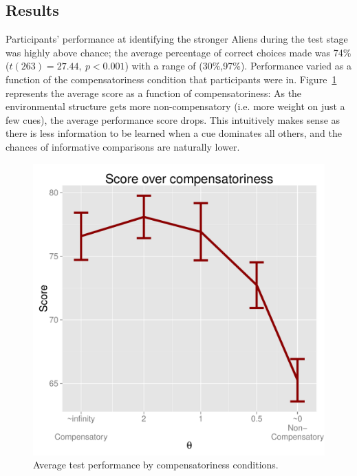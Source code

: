 \documentclass[10pt,letterpaper]{article}
\begin{document}
\subsection{Results}
Participants' performance at identifying the stronger Aliens during the test stage was highly above chance; the average percentage of correct choices made was 74\% ($t(263) = 27.44,~p< 0.001$) with a range of (30\%,97\%). Performance varied as a function of the compensatoriness condition that participants were in. Figure~\ref{performance} represents the average score as a function of compensatoriness: As the environmental structure gets more non-compensatory (i.e. more weight on just a few cues), the average performance score drops. This intuitively makes sense as there is less information to be learned when a cue dominates all others, and the chances of informative comparisons are naturally lower. 
\begin{figure}[htb!]
	\centering
\caption{Average test performance by compensatoriness conditions.}
	\label{performance}
	\centering
	\includegraphics[scale=0.4]{score.pdf}
	
\end{figure}
\end{document}
